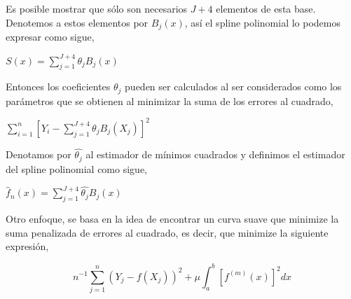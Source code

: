 \hspace{0.4cm}Es posible mostrar que s\'olo son necesarios $J+4$ elementos de esta base. Denotemos a estos elementos por $B_{j}(x)$, as\'i el spline polinomial lo podemos expresar como sigue,

\vspace{0.2cm}


\begin{center}

$\displaystyle{S(x)=\sum_{j=1}^{J+4} \theta_{j}B_{j}(x)}$
\end{center}

\vspace{0.2cm}

\hspace{0.4cm}Entonces los coeficientes $\theta_{j}$ pueden ser calculados al ser considerados como los par\'ametros que se obtienen al minimizar la suma de los errores al cuadrado,

\vspace{0.2cm}


\begin{center}
$\displaystyle{\sum_{i=1}^{n} \left[ Y_{i} - \sum_{j=1}^{J+4} \theta_{j}B_{j}(X_{j})\right]^2}$
\end{center}

\vspace{0.2cm}

\hspace{0.4cm}Denotamos por $\hat{\theta_{j}}$ al estimador de m\'inimos cuadrados y definimos el estimador del spline polinomial como sigue,

\vspace{0.2cm}


\begin{center}
$\displaystyle{ \hat{f}_{n}(x) = \sum_{j=1}^{J+4} \hat{\theta_{j}}B_{j}(x)}$
\end{center}

\vspace{0.2cm}


\hspace{0.5cm} Otro enfoque, se basa en la idea de encontrar un curva suave que minimize la suma penalizada de errores al cuadrado, es decir, que minimize la siguiente expresi\'on,

\begin{equation}\label{min}
  n^{-1}\sum_{j=1}^{n}(Y_{j}-f(X_{j}))^2+\mu \int_{a}^{b} [f^{(m)} (x)]^2 dx
\end{equation}

\vspace{0.2cm}

